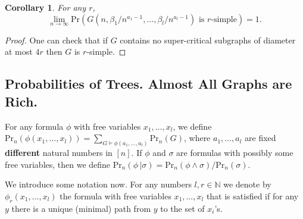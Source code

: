 \documentclass[11pt,notitlepage,a4paper]{article}
\newtheorem{corollary}{Corollary}[section]
\theoremstyle{definition}
\newcommand{\N}{\mathbb{N}}
\newcommand{\Ln}{\lim\limits_{n\to \infty}}
\begin{document}
\begin{corollary} \label{thm:simple} 
	For any $r$,
	\[\Ln \mathrm{Pr}(G(n,\beta_1/n^{a_1-1}, \dots,\beta_l/n^{a_l-1} ) \text{ is }r \text{-simple})=1 .\]
\end{corollary}
\begin{proof}
	One can check that if $G$ contains no super-critical subgraphs of
	diameter at most $4r$ then $G$ is $r$-simple.
\end{proof}


\subsection{Probabilities of Trees. Almost All Graphs are Rich.}



For any formula $\phi$ with free variables 
$x_1, \dots, x_l$, we define $\mathrm{Pr}_n(\phi(x_1,\dots,x_l))=
\sum\limits_{G\models \phi(a_1,\dots,a_l)} \mathrm{Pr}_n(G) $, 
where $a_1, \dots, a_l$ are fixed \textbf{different}
natural numbers in $[n]$. If $\phi$ and $\sigma$ are 
formulas with possibly some free variables, then we define
$\mathrm{Pr}_n(\phi \, | \sigma)=\mathrm{Pr}_n(\phi\wedge \sigma)/\mathrm{Pr}_n(\sigma)$. \par

We introduce some notation now. For any numbers $l,r\in \N$ 
we denote by $\phi_r(x_1,\dots, x_l)$ the formula
with free variables $x_1,\dots, x_l$
that is satisfied
if for any $y$ there is a unique
(minimal) path from $y$ to the set of $x_i$'s. 
\end{document}
